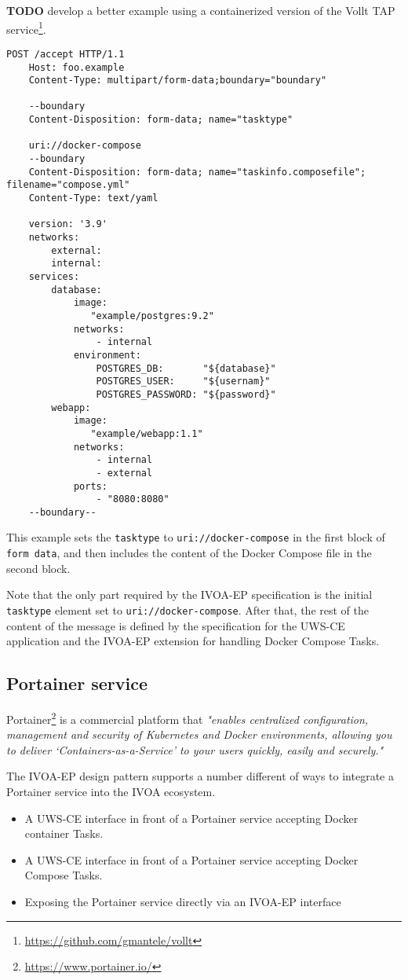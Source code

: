 \documentclass[11pt,a4paper]{ivoa}
\newcommand{\uwsce} {UWS-CE\xspace}
\newcommand{\ivoep} {IVOA-EP\xspace}
\newcommand{\docker} {Docker\xspace}
\newcommand{\dockercompose} {Docker Compose\xspace}
\newcommand{\portainer} {Portainer\xspace}
\newcommand{\codeword}[1] {\texttt{#1}}
\newcommand{\footurl}[1] {\footnote{\url{#1}}}
\begin{document}
\textbf{TODO} develop a better example using a containerized version of the Vollt TAP service\footurl{https://github.com/gmantele/vollt}.

\begin{lstlisting}[]
    POST /accept HTTP/1.1
    Host: foo.example
    Content-Type: multipart/form-data;boundary="boundary"

    --boundary
    Content-Disposition: form-data; name="tasktype"

    uri://docker-compose
    --boundary
    Content-Disposition: form-data; name="taskinfo.composefile"; filename="compose.yml"
    Content-Type: text/yaml

    version: '3.9'
    networks:
        external:
        internal:
    services:
        database:
            image:
               "example/postgres:9.2"
            networks:
                - internal
            environment:
                POSTGRES_DB:       "${database}"
                POSTGRES_USER:     "${usernam}"
                POSTGRES_PASSWORD: "${password}"
        webapp:
            image:
               "example/webapp:1.1"
            networks:
                - internal
                - external
            ports:
                - "8080:8080"
    --boundary--
\end{lstlisting}

This example sets the \codeword{tasktype} to \codeword{uri://docker-compose} in the first block of \codeword{form data}, and then includes the content of the \dockercompose file in the second block.

Note that the only part required by the \ivoep specification is the initial \codeword{tasktype} element set to \codeword{uri://docker-compose}.
After that, the rest of the content of the message is defined by the specification for the \uwsce application and the \ivoep extension for handling \dockercompose Tasks.

\subsection{Portainer service}
\label{sec:portainer-service}
\portainer\footurl{https://www.portainer.io/} is a commercial platform that \textit{"enables centralized configuration, management and security of Kubernetes and Docker environments, allowing you to deliver ‘Containers-as-a-Service’ to your users quickly, easily and securely."}

The \ivoep design pattern supports a number different of ways to integrate a \portainer service into the IVOA ecosystem.
\begin{itemize}
    \item A \uwsce interface in front of a \portainer service accepting \docker container Tasks.
    \item A \uwsce interface in front of a \portainer service accepting \dockercompose Tasks.
    \item Exposing the \portainer service directly via an \ivoep interface
\end{itemize}
\end{document}
